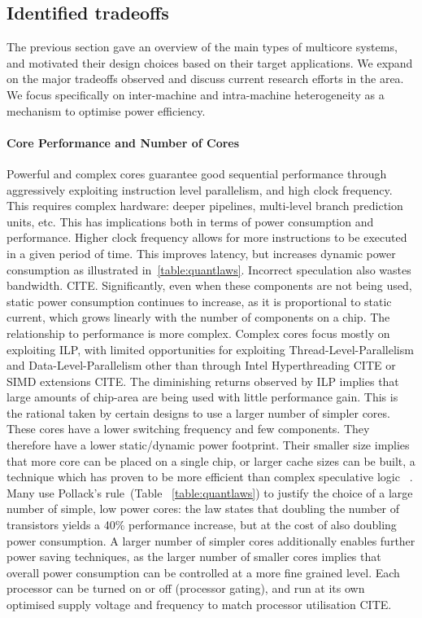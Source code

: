 \subsection{Identified tradeoffs}

The previous section gave an overview of the main types of multicore systems, 
and motivated their design choices based on their target applications. 
We expand on the major tradeoffs observed and discuss current research efforts in the area. 
We focus specifically on inter-machine and intra-machine heterogeneity as a mechanism
to optimise power efficiency. 

\paragraph{Core Performance and Number of Cores}

Powerful and complex cores guarantee good sequential performance
through aggressively exploiting instruction level parallelism,
and high clock frequency. This requires complex hardware:
deeper pipelines, multi-level branch prediction units, etc.
This has implications both in terms of power consumption
and performance. Higher clock frequency allows for more 
instructions to be executed in a given period of time. This
improves latency, but increases dynamic power consumption as illustrated
in~\ref{table:quantlaws}. Incorrect speculation also wastes bandwidth. CITE. 
Significantly, even when these components are not being used, 
static power consumption continues to increase, as it is proportional
to static current, which grows linearly with the number of components
on a chip. The relationship to performance is more complex. Complex cores
focus mostly on exploiting ILP, with limited opportunities
for exploiting Thread-Level-Parallelism and Data-Level-Parallelism
other than through Intel Hyperthreading CITE or SIMD extensions CITE. 
The diminishing returns observed by ILP implies that large amounts
of chip-area are being used with little performance gain. This is 
the rational taken by certain designs to use a larger number
of simpler cores. These cores have a lower switching frequency
and few components. They therefore have a lower static/dynamic power
footprint. Their smaller size implies that more core can be placed on 
a single chip, or larger cache sizes can be built, a technique
which has proven to be more efficient than complex speculative logic
~\cite{borkar2011future}.  Many use Pollack's rule~\cite{borkar2011future}(Table ~\ref{table:quantlaws})
to justify the choice of a large number of simple, low power cores: the 
law states that doubling the number of transistors yields
a 40\% performance increase, but at the cost of also doubling power consumption.
A larger number of simpler cores additionally enables further power saving techniques, as the larger number of smaller cores implies that overall power consumption can be controlled at a more fine grained level. 
Each processor can be turned on or off (processor gating), and run at its own
optimised supply voltage and frequency to match processor utilisation CITE. 

